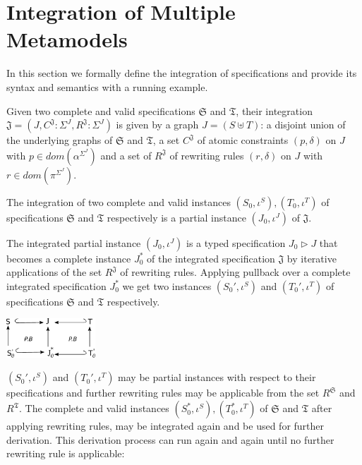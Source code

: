 \documentclass{eceasst}
\begin{document}
\section{Integration of Multiple Metamodels}\label{lbl:integration}
In this section we formally define the integration of specifications and provide its syntax and semantics with a running example. 

\begin{definition}
 Given two complete and valid specifications $\mathfrak{S}$ and $\mathfrak{T}$, their integration $\mathfrak{J} = (J, C^{\mathfrak{J}}: \Sigma^J, R^{\mathfrak{J}}:\Sigma^J)$ is given 
 by a graph $J = (S \uplus T)$: a disjoint union of the underlying graphs of $\mathfrak{S}$ and $\mathfrak{T}$, 
 a set $C^{\mathfrak{J}}$ of atomic constraints $(p, \delta)$ on $J$ with $p \in dom(\alpha^{\Sigma^J})$ and 
 a set of $R^{\mathfrak{J}}$ of rewriting rules $(r,\delta)$ on $J$ with $r \in dom(\pi^{\Sigma^J})$.
\end{definition}

\begin{proposition}
 The integration of two complete and valid instances $(S_0, \iota^S), (T_0, \iota^T)$ of specifications $\mathfrak{S}$ and $\mathfrak{T}$ respectively is a partial instance 
 $(J_0, \iota^J)$ of $\mathfrak{J}$.  
\end{proposition}

The integrated partial instance $(J_0, \iota^J)$ is a typed specification $J_0 \rhd J$ that becomes a complete instance $J_0^*$ of the integrated specification 
$\mathfrak{J}$ by iterative applications of the set $R^{\mathfrak{J}}$ of rewriting rules. 
Applying pullback over a complete integrated specification $J_0^*$ we get two instances $(S_0', \iota^S)$ and $(T_0', \iota^T)$ of 
specifications $\mathfrak{S}$ and $\mathfrak{T}$ respectively.

\begin{center}
\includegraphics[width=0.25\textwidth]{intr-pb.pdf}
\end{center}

\noindent
$(S_0', \iota^S)$ and $(T_0', \iota^T)$ may be partial instances with respect to their specifications and further rewriting rules may be applicable 
from the set $R^{\mathfrak{S}}$ and $R^{\mathfrak{T}}$. The complete and valid instances $(S_0^*, \iota^S), (T_0^*, \iota^T)$ of $\mathfrak{S}$ and $\mathfrak{T}$ after applying rewriting rules, 
may be integrated again and be used for further derivation. This derivation process can run again and again until no further rewriting rule is applicable: 
\end{document}
